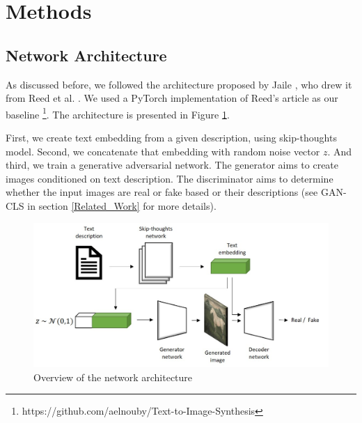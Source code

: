 \documentclass[a4paper]{article}
\begin{document}
\section{Methods}
\subsection{Network Architecture}
As discussed before, we followed the architecture proposed by Jaile \cite{Zhi2017PixelBrush}, who drew it from Reed et al. \cite{reed2016generative}. We used a PyTorch implementation of Reed's article as our baseline \footnote{https://github.com/aelnouby/Text-to-Image-Synthesis}. The architecture is presented in Figure \ref{fig:Network}.

First, we create text embedding from a given description, using skip-thoughts model. Second, we concatenate that embedding with random noise vector \(z\). And third, we train a generative adversarial network. The generator aims to create images conditioned on text description. The discriminator aims to determine whether the input images are real or fake based or their descriptions (see GAN-CLS in section \ref{Related_Work} for more details).

 \begin{figure}[ht]
    \centering
    \includegraphics[width=\textwidth]{network.jpg}
    \caption{Overview of the network architecture}
    \label{fig:Network}
\end{figure}
\end{document}
